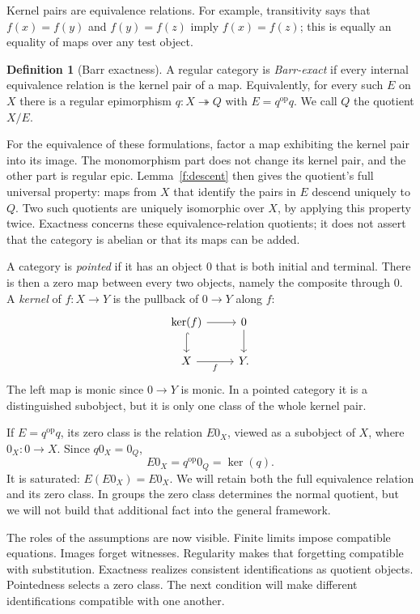\documentclass[11pt]{article}
\theoremstyle{definition}
\newtheorem{definition}[theorem]{Definition}
\theoremstyle{remark}\newtheorem{remark}[theorem]{Remark}
\DeclareMathOperator{\Ker}{ker}
\begin{document}
Kernel pairs are equivalence relations. For example, transitivity says
that $f(x)=f(y)$ and $f(y)=f(z)$ imply $f(x)=f(z)$; this is equally an
equality of maps over any test object.

\begin{definition}[Barr exactness]\label{f:exact}
A regular category is \emph{Barr-exact} if every internal equivalence
relation is the kernel pair of a map. Equivalently, for every such
$E$ on $X$ there is a regular epimorphism $q:X\twoheadrightarrow Q$
with $E=q^{\mathrm{op}}q$. We call $Q$ the quotient $X/E$.
\end{definition}

For the equivalence of these formulations, factor a map exhibiting the
kernel pair into its image. The monomorphism part does not change its
kernel pair, and the other part is regular epic. Lemma~\ref{f:descent}
then gives the quotient's full universal property: maps from $X$ that
identify the pairs in $E$ descend uniquely to $Q$. Two such quotients
are uniquely isomorphic over $X$, by applying this property twice.
Exactness concerns these equivalence-relation quotients; it does not
assert that the category is abelian or that its maps can be added.

A category is \emph{pointed} if it has an object $0$ that is both initial
and terminal. There is then a zero map between every two objects, namely
the composite through $0$. A \emph{kernel} of $f:X\to Y$ is the
pullback of $0\to Y$ along $f$:
\[
\begin{tikzcd}
\Ker(f) \arrow[r] \arrow[d,hook] & 0 \arrow[d]\\
X \arrow[r,"f"'] & Y.
\end{tikzcd}
\]
The left map is monic since $0\to Y$ is monic. In a pointed category
it is a distinguished subobject, but it is only one class of the whole
kernel pair.

If $E=q^{\mathrm{op}}q$, its zero class is the relation $E0_X$,
viewed as a subobject of $X$, where $0_X:0\to X$. Since $q0_X=0_Q$,
\[
E0_X=q^{\mathrm{op}}0_Q=\Ker(q).
\]
It is saturated: $E(E0_X)=E0_X$. We will retain both the full
equivalence relation and its zero class. In groups the zero class
determines the normal quotient, but we will not build that additional
fact into the general framework.

The roles of the assumptions are now visible. Finite limits impose
compatible equations. Images forget witnesses. Regularity makes that
forgetting compatible with substitution. Exactness realizes consistent
identifications as quotient objects. Pointedness selects a zero class.
The next condition will make different identifications compatible with
one another.
\end{document}
